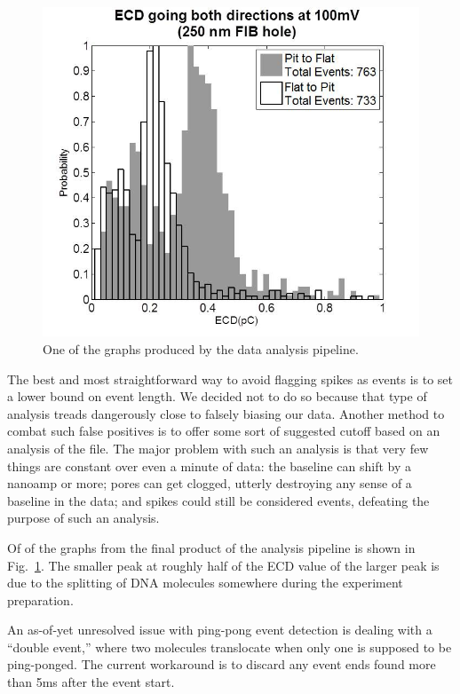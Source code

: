\documentclass[aps,prl,preprint,groupedaddress]{revtex4}
\begin{document}
\begin{figure}[H]
\centering
\includegraphics[width=1\textwidth]{figures/monodirectional-ecds}
\caption{One of the graphs produced by the data analysis pipeline.}
\label{fig:ecds}
\end{figure}

The best and most straightforward way to avoid flagging spikes as events is to set a lower bound on event length.
We decided not to do so because that type of analysis treads dangerously close to falsely biasing our data.
Another method to combat such false positives is to offer some sort of suggested cutoff based on an analysis of the file.
The major problem with such an analysis is that very few things are constant over even a minute of data: the baseline can shift by a nanoamp or more; pores can get clogged, utterly destroying any sense of a baseline in the data; and spikes could still be considered events, defeating the purpose of such an analysis.

Of of the graphs from the final product of the analysis pipeline is shown in Fig.~\ref{fig:ecds}. The smaller peak at roughly half of the ECD value of the larger peak is due to the splitting of DNA molecules somewhere during the experiment preparation.

An as-of-yet unresolved issue with ping-pong event detection is dealing with a ``double event,'' where two molecules translocate when only one is supposed to be ping-ponged.
The current workaround is to discard any event ends found more than 5ms after the event start.
\end{document}
